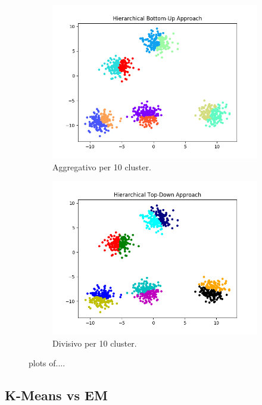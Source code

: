 \documentclass{llncs}
\begin{document}
\begin{figure}[h]
\begin{subfigure}{.5\textwidth}
			\includegraphics[width=\linewidth]{immagini/5_clusters_10_agg.png}
			\caption{Aggregativo per 10 cluster.}
			\label{hier:c}			
		  \end{subfigure}
		  \begin{subfigure}{.5\textwidth}
			\centering
			\includegraphics[width=\linewidth]{immagini/5_clusters_10_div.png}
			\caption{Divisivo per 10 cluster.}
			\label{hier:d}			
		  \end{subfigure}
		\caption{plots of....}
		\label{hier:test}
	\end{figure}
	
	\subsection{K-Means vs EM}
\end{document}
